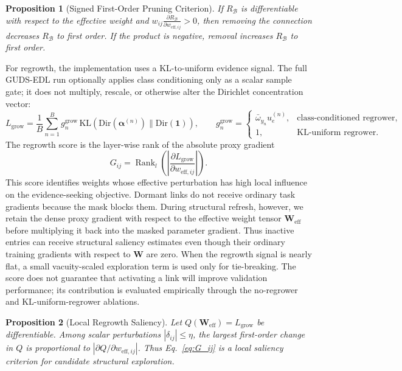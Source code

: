\documentclass[letterpaper]{article} %
\newcommand{\Dir}{\text{Dir}}
\newcommand{\KL}{\text{KL}}
\newtheorem{proposition}{Proposition}
\begin{document}
\begin{proposition}[Signed First-Order Pruning Criterion]
\label{prop:signed_pruning}
If $R_{\mathcal B}$ is differentiable with respect to the effective weight and $w_{ij}\frac{\partial R_{\mathcal B}}{\partial w_{\text{eff},ij}}>0$, then removing the connection decreases $R_{\mathcal B}$ to first order. If the product is negative, removal increases $R_{\mathcal B}$ to first order.
\end{proposition}

For regrowth, the implementation uses a KL-to-uniform evidence signal. The full GUDS-EDL run optionally applies class conditioning only as a scalar sample gate; it does not multiply, rescale, or otherwise alter the Dirichlet concentration vector:
\begin{equation}\label{eq:grow_objective}
    L_{\text{grow}}
    =
    \frac{1}{B}\sum_{n=1}^{B}
    g_n^{\text{grow}}\,
    \KL(\Dir(\bm{\alpha}^{(n)})\parallel\Dir(\mathbf{1})),
    \qquad
    g_n^{\text{grow}}
    =
    \begin{cases}
    \bar{\omega}_{y_n}u_e^{(n)}, & \text{class-conditioned regrower},\\
    1, & \text{KL-uniform regrower}.
    \end{cases}
\end{equation}
The regrowth score is the layer-wise rank of the absolute proxy gradient
\begin{equation}\label{eq:G_ij}
    G_{ij}
    =
    \operatorname{Rank}_{l}\!\left(
    \left|
    \frac{\partial L_{\text{grow}}}
    {\partial w_{\text{eff},ij}}
    \right|
    \right).
\end{equation}
This score identifies weights whose effective perturbation has high local influence on the evidence-seeking objective. Dormant links do not receive ordinary task gradients because the mask blocks them. During structural refresh, however, we retain the dense proxy gradient with respect to the effective weight tensor $\bm{W}_{\text{eff}}$ before multiplying it back into the masked parameter gradient. Thus inactive entries can receive structural saliency estimates even though their ordinary training gradients with respect to $\bm{W}$ are zero. When the regrowth signal is nearly flat, a small vacuity-scaled exploration term is used only for tie-breaking. The score does not guarantee that activating a link will improve validation performance; its contribution is evaluated empirically through the no-regrower and KL-uniform-regrower ablations.

\begin{proposition}[Local Regrowth Saliency]
\label{prop:regrowth_saliency}
Let $Q(\bm{W}_{\text{eff}})=L_{\text{grow}}$ be differentiable. Among scalar perturbations $|\delta_{ij}|\le\eta$, the largest first-order change in $Q$ is proportional to $\left|\partial Q/\partial w_{\text{eff},ij}\right|$. Thus Eq.~\ref{eq:G_ij} is a local saliency criterion for candidate structural exploration.
\end{proposition}
\end{document}
